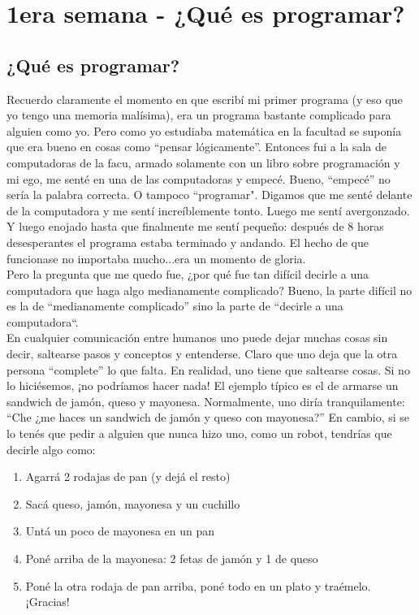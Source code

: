 \chapter{1era semana - ¿Qué es programar?}
\section{¿Qué es programar?}
Recuerdo claramente el momento en que escribí mi primer programa (y eso que yo tengo una memoria malísima), era un programa bastante complicado para alguien como yo. Pero como yo estudiaba matemática en la facultad se suponía que era bueno en cosas como ``pensar lógicamente''. Entonces fui a la sala de computadoras de la facu, armado solamente con un libro sobre programación y mi ego, me senté en una de las computadoras y empecé. Bueno, ``empecé'' no sería la palabra correcta. O tampoco ``programar". Digamos que me senté delante de la computadora y me sentí increíblemente tonto. Luego me sentí avergonzado. Y luego enojado hasta que finalmente me sentí pequeño: después de 8 horas desesperantes el programa estaba terminado y andando. El hecho de que funcionase no importaba mucho...era un momento de gloria.\\

Pero la pregunta que me quedo fue, ¿por qué fue tan difícil decirle a una computadora que haga algo medianamente complicado? Bueno, la parte difícil no es la de ``medianamente complicado'' sino la parte de ``decirle a una computadora``.\\

En cualquier comunicación entre humanos uno puede dejar muchas cosas sin decir, saltearse pasos y conceptos y entenderse. Claro que uno deja que la otra persona ``complete'' lo que falta. En realidad, uno tiene que saltearse cosas. Si no lo hiciésemos, ¡no podríamos hacer nada! El ejemplo típico es el  de armarse un sandwich de jamón, queso y mayonesa. Normalmente, uno diría tranquilamente: ``Che ¿me haces un sandwich de jamón y queso con mayonesa?'' En cambio, si se lo tenés que pedir a alguien que nunca hizo uno, como un robot, tendrías que decirle algo como:
\begin{enumerate}
  \item Agarrá 2 rodajas de pan (y dejá el resto)
  \item Sacá queso, jamón, mayonesa y un cuchillo
  \item Untá un poco de mayonesa en un pan
  \item Poné arriba de la mayonesa: 2 fetas de jamón y 1 de queso
  \item Poné la otra rodaja de pan arriba, poné todo en un plato y traémelo. ¡Gracias!
\end{enumerate}

